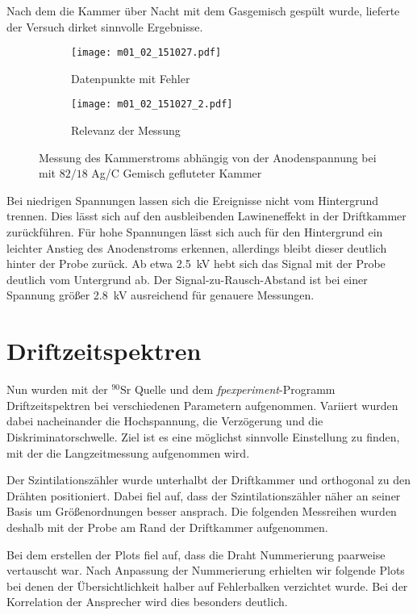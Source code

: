 \documentclass[11pt, ngerman, fleqn, DIV=15, headinclude, BCOR=2cm]{scrreprt}
\begin{document}
Nach dem die Kammer über Nacht mit dem Gasgemisch gespült wurde, lieferte der
Versuch dirket sinnvolle Ergebnisse.

\begin{figure}
	\centering
	\begin{subfigure}{0.49 \linewidth}
        \texttt{[image: m01\_02\_151027.pdf]}
        \caption{%
		Datenpunkte mit Fehler
        }
        \label{fig:m01_02_messdaten}
    \end{subfigure}
    \begin{subfigure}{0.49 \linewidth}
        \texttt{[image: m01\_02\_151027\_2.pdf]}
        \caption{%
		Relevanz der Messung
       }
        \label{fig:m01_02_relevanz}
    \end{subfigure}
    \caption{%
	    Messung des Kammerstroms abhängig von der Anodenspannung bei mit
	    $82/18$ Ag/C Gemisch gefluteter Kammer
    }
    \label{fig:m01_02_plots}
\end{figure}

Bei niedrigen Spannungen lassen sich die Ereignisse nicht vom Hintergrund
trennen. 
Dies lässt sich auf den ausbleibenden Lawineneffekt in der Driftkammer
zurückführen.
Für hohe Spannungen lässt sich auch für den Hintergrund ein leichter
Anstieg des Anodenstroms erkennen, allerdings bleibt dieser deutlich hinter der
Probe zurück.
Ab etwa \SI{2.5}{\kilo\volt} hebt sich das Signal mit der Probe deutlich vom
Untergrund ab. Der Signal-zu-Rausch-Abstand ist bei einer Spannung größer
\SI{2.8}{\kilo\volt} ausreichend für genauere Messungen.

\section{Driftzeitspektren}
Nun wurden mit der $^{90}\text{Sr}$ Quelle und dem \emph{fpexperiment}-Programm
Driftzeitspektren bei verschiedenen Parametern aufgenommen.
Variiert wurden dabei nacheinander die Hochspannung, die Verzögerung und die
Diskriminatorschwelle.
Ziel ist es eine möglichst sinnvolle Einstellung zu finden, mit der die
Langzeitmessung aufgenommen wird.

Der Szintilationszähler wurde unterhalbt der Driftkammer und orthogonal zu
den Drähten positioniert.
Dabei fiel auf, dass der Szintilationszähler näher an seiner Basis um
Größenordnungen  besser ansprach.
Die folgenden Messreihen wurden deshalb mit der Probe am Rand der
Driftkammer aufgenommen.

Bei dem erstellen der Plots fiel auf, dass die Draht Nummerierung paarweise
vertauscht war.
Nach Anpassung der Nummerierung erhielten wir folgende Plots bei denen der Übersichtlichkeit halber auf Fehlerbalken
verzichtet wurde. 
Bei der Korrelation der Ansprecher wird dies besonders deutlich.
\end{document}
